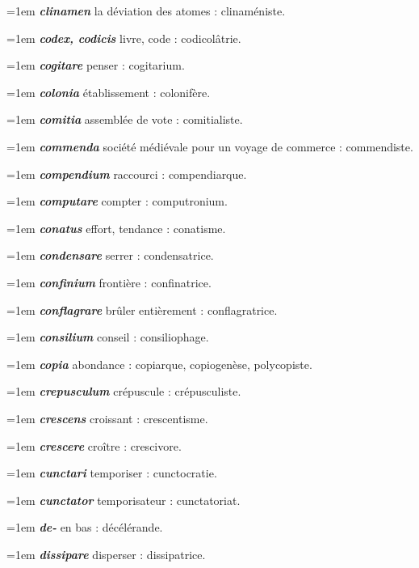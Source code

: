 \hangindent=1em \textbf{\textit{clinamen}} la déviation des atomes : clinaméniste.\par
\hangindent=1em \textbf{\textit{codex, codicis}} livre, code : codicolâtrie.\par
\hangindent=1em \textbf{\textit{cogitare}} penser : cogitarium.\par
\hangindent=1em \textbf{\textit{colonia}} établissement : colonifère.\par
\hangindent=1em \textbf{\textit{comitia}} assemblée de vote : comitialiste.\par
\hangindent=1em \textbf{\textit{commenda}} société médiévale pour un voyage de commerce : commendiste.\par
\hangindent=1em \textbf{\textit{compendium}} raccourci : compendiarque.\par
\hangindent=1em \textbf{\textit{computare}} compter : computronium.\par
\hangindent=1em \textbf{\textit{conatus}} effort, tendance : conatisme.\par
\hangindent=1em \textbf{\textit{condensare}} serrer : condensatrice.\par
\hangindent=1em \textbf{\textit{confinium}} frontière : confinatrice.\par
\hangindent=1em \textbf{\textit{conflagrare}} brûler entièrement : conflagratrice.\par
\hangindent=1em \textbf{\textit{consilium}} conseil : consiliophage.\par
\hangindent=1em \textbf{\textit{copia}} abondance : copiarque, copiogenèse, polycopiste.\par
\hangindent=1em \textbf{\textit{crepusculum}} crépuscule : crépusculiste.\par
\hangindent=1em \textbf{\textit{crescens}} croissant : crescentisme.\par
\hangindent=1em \textbf{\textit{crescere}} croître : crescivore.\par
\hangindent=1em \textbf{\textit{cunctari}} temporiser : cunctocratie.\par
\hangindent=1em \textbf{\textit{cunctator}} temporisateur : cunctatoriat.\par
\hangindent=1em \textbf{\textit{de-}} en bas : décélérande.\par
\hangindent=1em \textbf{\textit{dissipare}} disperser : dissipatrice.\par
